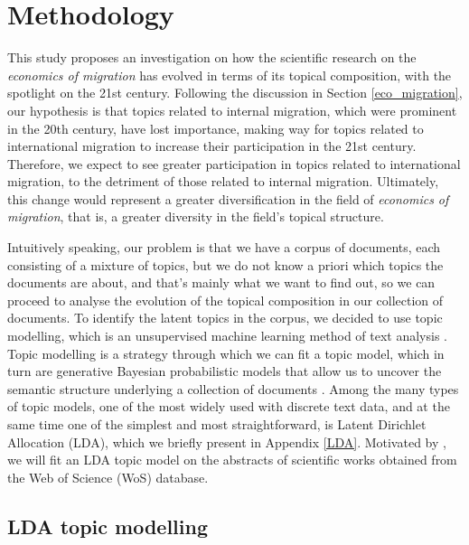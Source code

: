 \section{Methodology} \label{methodology}

This study proposes an investigation on how the scientific research on the \textit{economics of migration} has evolved in terms of its topical composition, with the spotlight on the 21st century. Following the discussion in Section \ref{eco_migration}, our hypothesis is that topics related to internal migration, which were prominent in the 20th century, have lost importance, making way for topics related to international migration to increase their participation in the 21st century. Therefore, we expect to see greater participation in topics related to international migration, to the detriment of those related to internal migration. Ultimately, this change would represent a greater diversification in the field of \textit{economics of migration}, that is, a greater diversity in the field's topical structure.

Intuitively speaking, our problem is that we have a corpus of documents, each consisting of a mixture of topics, but we do not know a priori which topics the documents are about, and that's mainly what we want to find out, so we can proceed to analyse the evolution of the topical composition in our collection of documents. To identify the latent topics in the corpus, we decided to use topic modelling, which is an unsupervised machine learning method of text analysis \citep{evans_machine_2016}. Topic modelling is a strategy through which we can fit a topic model, which in turn are generative Bayesian probabilistic models that allow us to uncover the semantic structure underlying a collection of documents \citep{blei_latent_2003, blei_topic_2009}. Among the many types of topic models, one of the most widely used with discrete text data, and at the same time one of the simplest and most straightforward, is Latent Dirichlet Allocation (LDA), which we briefly present in Appendix \ref{LDA}. Motivated by \cite{pisarevskaya_mapping_2020}, we will fit an LDA topic model on the abstracts of scientific works obtained from the Web of Science (WoS) database.

\subsection{LDA topic modelling} \label{topic_modelling}

